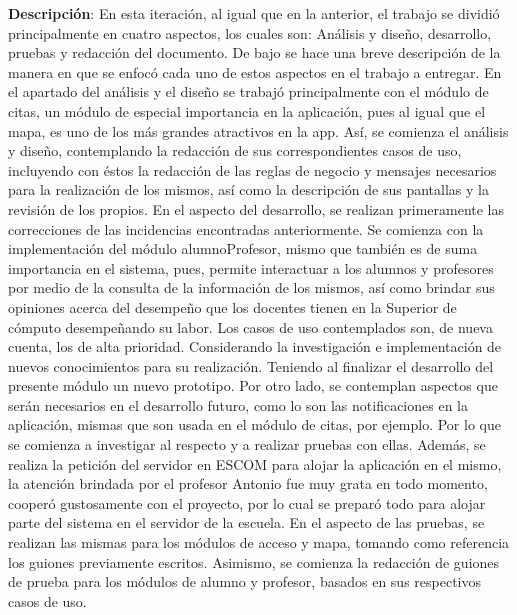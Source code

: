 \noindent
\textbf{Descripción}: En esta iteración, al igual que en la anterior, el trabajo se dividió principalmente en cuatro aspectos, los cuales son: Análisis y diseño, desarrollo, pruebas y redacción del documento. De bajo se hace una breve descripción de la manera en que se enfocó cada uno de estos aspectos en el trabajo a entregar.
\newline
\newline
En el apartado del análisis y el diseño se trabajó principalmente con el módulo de citas, un módulo de especial importancia en la aplicación, pues al igual que el mapa, es uno de los más grandes atractivos en la app. Así, se comienza el análisis y diseño, contemplando la redacción de sus correspondientes casos de uso, incluyendo con éstos la redacción de las reglas de negocio y mensajes necesarios para la realización de los mismos, así como la descripción de sus pantallas y la revisión de los propios. 
\newline
\newline
En el aspecto del desarrollo, se realizan primeramente las correcciones de las incidencias encontradas anteriormente. Se comienza con la implementación del módulo alumnoProfesor, mismo que también es de suma importancia en el sistema, pues, permite interactuar a los alumnos y profesores por medio de la consulta de la información de los mismos, así como brindar sus opiniones acerca del desempeño que los docentes tienen en la Superior de cómputo desempeñando su labor. Los casos de uso contemplados son, de nueva cuenta, los de alta prioridad. Considerando la investigación e implementación de nuevos conocimientos para su realización. Teniendo al finalizar el desarrollo del presente módulo un nuevo prototipo. 
\newline
Por otro lado, se contemplan aspectos que serán necesarios en el desarrollo futuro, como lo son las notificaciones en la aplicación, mismas que son usada en el módulo de citas, por ejemplo. Por lo que se comienza a investigar al respecto y a realizar pruebas con ellas. 
\newline
Además, se realiza la petición del servidor en ESCOM para alojar la aplicación en el mismo, la atención brindada por el profesor Antonio fue muy grata en todo momento, cooperó gustosamente con el proyecto, por lo cual se preparó todo para alojar parte del sistema en el servidor de la escuela.
\newline
\newline
En el aspecto de las pruebas, se realizan las mismas para los módulos de acceso y mapa, tomando como referencia los guiones previamente escritos. Asimismo, se comienza la redacción de guiones de prueba para los módulos de alumno y profesor, basados en sus respectivos casos de uso. 
